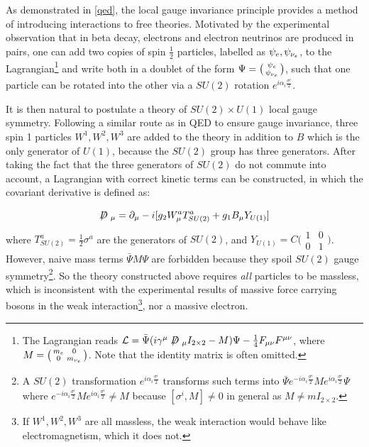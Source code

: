 As demonstrated in \cref{qed}, the local gauge invariance principle provides a
method of introducing interactions to free theories.
Motivated by the experimental observation that in beta decay, electrons and
electron neutrinos are produced in pairs,
one can add two copies of spin $\frac{1}{2}$ particles,
labelled as $\psi_e, \psi_{{\nu}_e}$,
to the Lagrangian\footnote{
    The Lagrangian reads
    $\mathcal{L} = \bar{\Psi} (i \gamma^\mu \fsl{D}_\mu I_{2 \times 2} - M)\Psi -
    \frac{1}{4} F_{\mu\nu}F^{\mu\nu}$,
    where $M = \bigl(\begin{smallmatrix} m_e & 0 \\ 0 & m_{{\nu}_e} \end{smallmatrix}\bigr)$.
    Note that the identity matrix is often omitted.
} and write both in a doublet
of the form
$\Psi = \bigl(\begin{smallmatrix} \psi_e \\ \psi_{{\nu}_e} \end{smallmatrix}\bigr)$,
such that one particle can be rotated into the other via a $SU(2)$ rotation
$e^{i \alpha_i \frac{\sigma^i}{2}}$.

It is then natural to postulate a theory of $SU(2) \times U(1)$ local gauge
symmetry.
Following a similar route as in QED to ensure gauge invariance,
three spin 1 particles $W^1, W^2, W^3$ are added to the theory in addition to
$B$ which is the only generator of $U(1)$,
because the $SU(2)$ group has three generators.
After taking the fact that the three generators of $SU(2)$ do not commute into
account, a Lagrangian with correct kinetic terms can be constructed, in which
the covariant derivative is defined as:

\begin{equation}
    \fsl{D}_\mu = \partial_\mu - i[g_2 W_\mu^a T^a_{SU(2)} + g_1 B_\mu Y_{U(1)}]
\end{equation}
where $T^a_{SU(2)} = \frac{1}{2} \sigma^a$ are the generators of $SU(2)$,
and
$Y_{U(1)} = C \bigl(\begin{smallmatrix} 1 & 0 \\ 0 & 1 \end{smallmatrix}\bigr)$.
However, naive mass terms $\bar{\Psi} M \Psi$ are forbidden because they
spoil $SU(2)$ gauge symmetry\footnote{
    A $SU(2)$ transformation $e^{i \alpha_i \frac{\sigma^i}{2}}$ transforms such
    terms into
    $\bar{\Psi} e^{-i \alpha_i \frac{\sigma^i}{2}} M e^{i \alpha_i \frac{\sigma^i}{2}} \Psi$
    where $e^{-i \alpha_i \frac{\sigma^i}{2}} M e^{i \alpha_i \frac{\sigma^i}{2}} \neq M$
    because $[\sigma^i, M] \neq 0$ in general as $M \neq m I_{2 \times 2}$.
}.
So the theory constructed above requires \emph{all} particles to be massless,
which is inconsistent with the experimental results of massive force carrying
bosons in the weak interaction\footnote{
    If $W^1, W^2, W^3$ are all massless, the weak interaction would behave like
    electromagnetism, which it does not.
}, nor a massive electron.

